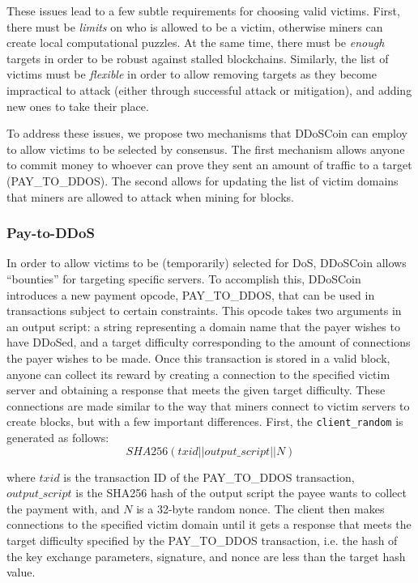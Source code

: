 These issues lead to a few subtle requirements for choosing valid victims.
First, there must be \emph{limits} on who is allowed to be a victim, otherwise
miners can create local computational puzzles. At the same time, there must be
\emph{enough} targets in order to be robust against stalled blockchains.
Similarly, the list of victims must be \emph{flexible} in order to allow
removing targets as they become impractical to attack (either
through successful attack or mitigation), and adding new ones to take their
place.

To address these issues, we propose two mechanisms that DDoSCoin can
employ to allow victims to be selected by consensus. The first mechanism allows
anyone to commit money to whoever can prove they sent an amount of traffic to a target
(PAY\_TO\_DDOS). The second allows for updating the list of victim domains that
miners are allowed to attack when mining for blocks.


\subsubsection{Pay-to-DDoS}

\label{sec:pay-to-ddos}

In order to allow victims to be (temporarily) selected for DoS, DDoSCoin allows
``bounties'' for targeting specific servers. To accomplish this, DDoSCoin
introduces a new payment opcode, PAY\_TO\_DDOS, that can be used in transactions
subject to certain constraints. This opcode takes two arguments in an output
script: a string representing a domain name that the payer wishes to have
DDoSed, and a target difficulty corresponding to the amount of connections the
payer wishes to be made. Once this transaction is stored in a valid block,
anyone can collect its reward by creating a connection to the specified victim
server and obtaining a response that meets the given target difficulty. These
connections are made similar to the way that miners connect to victim servers to
create blocks, but with a few important differences. First, the
\texttt{client\_random} is generated as follows:
\begin{equation}
SHA256(txid || output\_script || N)
\end{equation}

where $txid$ is the transaction ID of the PAY\_TO\_DDOS transaction,
$output\_script$ is the SHA256 hash of the output script the payee wants to collect the
payment with, and $N$ is a 32-byte random nonce.  The client then makes connections to the
specified victim domain until it gets a response that meets the target
difficulty specified by the PAY\_TO\_DDOS transaction, i.e. the hash of the key exchange 
parameters, signature, and nonce are less than the target hash value.

